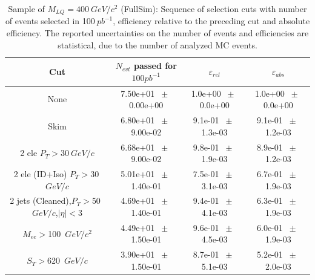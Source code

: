 \documentclass{cmspaper}
\begin{document}
\begin{linenumbers}
\begin{table}[htbp] 
\begin{center} 
\begin{tabular}{|c|c|c|c|} 
\hline\hline 
 Cut & $N_{evt}$ passed for $100pb^{-1}$ & $\varepsilon_{rel}$ & $\varepsilon_{abs}$ \\ 
\hline\hline 
None       &        7.50e+01       $~\pm~$       0.00e+00        &        1.0e+00       $~\pm~$       0.0e+00        &        1.0e+00       $~\pm~$       0.0e+00       \\       
       Skim       &        6.80e+01       $~\pm~$       9.00e-02        &        9.1e-01       $~\pm~$       1.3e-03        &        9.1e-01       $~\pm~$       1.2e-03       \\       
       2 ele $P_T>30~$$GeV/c$       &        6.68e+01       $~\pm~$       9.00e-02        &        9.8e-01       $~\pm~$       1.9e-03        &        8.9e-01       $~\pm~$       1.2e-03       \\       
       2 ele (ID+Iso) $P_T>30~$$GeV/c$       &        5.01e+01       $~\pm~$       1.40e-01        &        7.5e-01       $~\pm~$       3.1e-03        &        6.7e-01       $~\pm~$       1.9e-03       \\       
       2 jets (Cleaned),$P_T>$50~$GeV/c$,$|\eta|<$3       &        4.69e+01       $~\pm~$       1.40e-01        &        9.4e-01       $~\pm~$       4.1e-03        &        6.3e-01       $~\pm~$       1.9e-03       \\       
       $M_{ee}>$100~$GeV/c^2$       &        4.49e+01       $~\pm~$       1.50e-01        &        9.6e-01       $~\pm~$       4.5e-03        &        6.0e-01       $~\pm~$       1.9e-03       \\       
       $S_T>$620~$GeV/c$       &        3.90e+01       $~\pm~$       1.50e-01        &        8.7e-01       $~\pm~$       5.1e-03        &        5.2e-01       $~\pm~$       2.0e-03       \\       
          \hline\hline 
\end{tabular} 
\end{center} 
\caption{Sample of $M_{LQ}=400~$$GeV/c^2$ (FullSim): Sequence of selection cuts with number of events selected in 100$~pb^{-1}$, efficiency relative to the preceding cut and absolute efficiency. The reported uncertainties on the number of events and efficiencies are statistical, due to the number of analyzed MC events.} 
\label{tab:effic-MLQ400} 
\end{table} 




\end{linenumbers}
\end{document}
